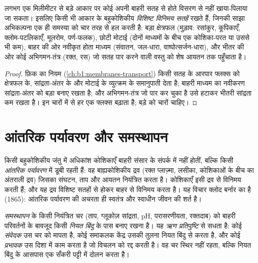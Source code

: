 \begin{proposition}\label{prop:b1:organism-environment:surfaces}
लगभग एक मिलीमीटर से बड़े आकार पर कोई  अपनी बाहरी सतह से होते विसरण से
नहीं खाया-पिलाया जा सकता। इसलिए किसी भी आकार के बहुकोशिकीय 
\emph{विशिष्ट विनिमय सतहें} रखते हैं, जिनकी साझा
अभिकल्पना एक ही समस्या को चार तरह से हल करती है: बड़ा क्षेत्रफल (मुड़ाव:
रसांकुर, कूपिकाएँ, क्लोम-पटलिकाएँ, मूलरोम, पर्ण-फलक), छोटी मोटाई (दोनों
माध्यमों के बीच एक कोशिका-परत या उससे भी कम), बाहर की ओर नवीकृत होता
माध्यम (संवातन, जल-धारा, वाष्पोत्सर्जन-धारा), और भीतर की ओर कोई
अभिगमन-तंत्र (रक्त, रस) जो सतह पार करने वाली वस्तु को शेष आयतन तक
पहुँचाता है।
\end{proposition}
\begin{proof}
फ़िक का नियम (\cref{ch:b1:membranes-transport}) किसी सतह के आरपार फ्लक्स
को क्षेत्रफल के, सांद्रता-अंतर के और मोटाई के व्युत्क्रम के समानुपाती
देता है; बाहरी माध्यम का नवीकरण सांद्रता-अंतर को बड़ा बनाए रखता है; और
अभिगमन-तंत्र जो पार कर चुका है उसे हटाकर भीतरी सांद्रता कम रखता है। इन
चारों में से हर एक फ्लक्स बढ़ाता है; बड़े  को चारों चाहिए।
\end{proof}

\section{आंतरिक पर्यावरण और समस्थापन}

\begin{definition}[आंतरिक पर्यावरण]\label{def:b1:organism-environment:milieu}
किसी बहुकोशिकीय जंतु में अधिकांश कोशिकाएँ बाहरी संसार के संपर्क में नहीं
होतीं, बल्कि किसी \emph{आंतरिक पर्यावरण} में डूबी
रहती हैं: वह बाह्यकोशिकीय द्रव (रक्त प्लाज़्मा, लसीका, कोशिकाओं के बीच
का अंतराली द्रव) जिसका संघटन, ताप और आयतन  नियंत्रित करता है।
कोशिकाएँ इसी द्रव से विनिमय करती हैं; और यह द्रव विशिष्ट सतहों से होकर
बाहर से विनिमय करता है। यह विचार क्लोद बर्नार का है (1865): आंतरिक
पर्यावरण की अचरता ही स्वतंत्र और स्वाधीन जीवन की शर्त है।
\end{definition}

\begin{definition}[समस्थापन]\label{def:b1:organism-environment:homeostasis}
\emph{समस्थापन}  के किसी नियंत्रित चर
(ताप, ग्लूकोज़ सांद्रता, pH, परासरणीयता, रक्तदाब) को बाहरी परिवर्तनों के
बावजूद किसी \emph{नियत बिंदु} के पास बनाए रखना है। यह
\emph{ऋण प्रतिपुष्टि} से सधता है: कोई
\emph{संवेदक} उस चर को मापता है, कोई समाकलक केंद्र उसकी तुलना नियत बिंदु
से करता है, और कोई \emph{प्रभावक} उस दिशा में काम करता है जो विचलन को
रद्द करती है। वह चर स्थिर नहीं रहता, बल्कि नियत बिंदु के आसपास एक सँकरी
पट्टी में दोलन करता है।
\end{definition}


